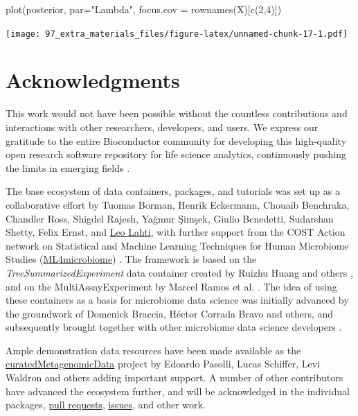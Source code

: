 \documentclass[
]{book}
\newenvironment{Shaded}{\begin{snugshade}}{\end{snugshade}}
\newcommand{\AttributeTok}[1]{\textcolor[rgb]{0.77,0.63,0.00}{#1}}
\newcommand{\DecValTok}[1]{\textcolor[rgb]{0.00,0.00,0.81}{#1}}
\newcommand{\FunctionTok}[1]{\textcolor[rgb]{0.00,0.00,0.00}{#1}}
\newcommand{\NormalTok}[1]{#1}
\newcommand{\StringTok}[1]{\textcolor[rgb]{0.31,0.60,0.02}{#1}}
\begin{document}
\begin{Shaded}
\begin{Highlighting}[]
\FunctionTok{plot}\NormalTok{(posterior, }\AttributeTok{par=}\StringTok{"Lambda"}\NormalTok{, }\AttributeTok{focus.cov =} \FunctionTok{rownames}\NormalTok{(X)[}\FunctionTok{c}\NormalTok{(}\DecValTok{2}\NormalTok{,}\DecValTok{4}\NormalTok{)])}
\end{Highlighting}
\end{Shaded}

\texttt{[image: 97\_extra\_materials\_files/figure-latex/unnamed-chunk-17-1.pdf]}

\hypertarget{acknowledgments}{%
\chapter{Acknowledgments}\label{acknowledgments}}

This work would not have been possible without the countless
contributions and interactions with other researchers, developers, and
users. We express our gratitude to the entire Bioconductor community
for developing this high-quality open research software repository for
life science analytics, continuously pushing the limits in emerging
fields \citep[\citet{Huber2015}]{Gentleman2004}.

The base ecosystem of data containers, packages, and tutorials was set
up as a collaborative effort by Tuomas Borman, Henrik Eckermann,
Chouaib Benchraka, Chandler Ross, Shigdel Rajesh, Yağmur Şimşek,
Giulio Benedetti, Sudarshan Shetty, Felix Ernst, and \href{http://www.iki.fi/Leo.Lahti}{Leo
Lahti}, with further support from the
COST Action network on Statistical and Machine Learning Techniques for
Human Microbiome Studies
(\href{https://www.ml4microbiome.eu/}{ML4microbiome})
\citep{MorenoIndias2021}. The framework is based on the
\emph{TreeSummarizedExperiment} data container created by Ruizhu Huang and
others \citep{R-TreeSummarizedExperiment}, and on the MultiAssayExperiment
by Marcel Ramos et al. \citep{Ramos2017}. The idea of using
these containers as a basis for microbiome data science was initially
advanced by the groundwork of Domenick Braccia, Héctor Corrada Bravo
and others, and subsequently brought together with other microbiome
data science developers \citep{Shetty2019}.

Ample demonstration data resources have been made available as the
\href{https://waldronlab.io/curatedMetagenomicData/}{curatedMetagenomicData}
project by Edoardo Pasolli, Lucas Schiffer, Levi Waldron and others
\citep{Pasolli2017} adding important support.
A number of other contributors have advanced the ecosystem
further, and will be acknowledged in the individual
packages, \href{https://github.com/microbiome/OMA/graphs/contributors}{pull
requests},
\href{https://github.com/microbiome/OMA/issues}{issues}, and other work.
\end{document}
